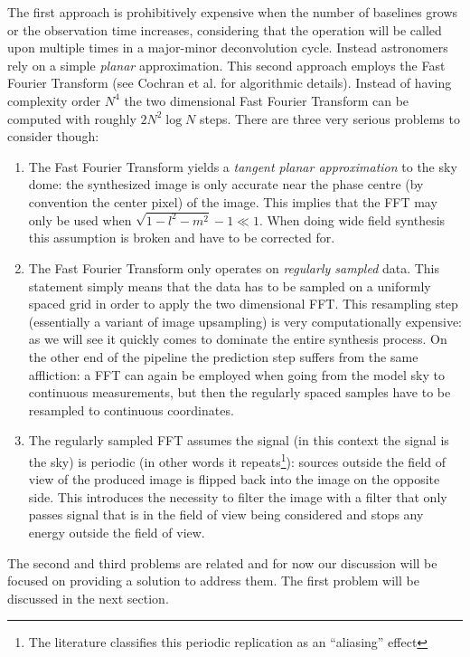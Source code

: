  The first approach is prohibitively expensive when the number of baselines grows or the observation time increases, considering that the operation will be called upon multiple times in a major-minor deconvolution cycle. Instead astronomers rely
 on a simple \emph{planar} approximation. This second approach employs the Fast Fourier Transform (see Cochran et al. \cite{cochran1967fast} for algorithmic details). Instead of having complexity order $N^4$ the two dimensional Fast Fourier 
 Transform can be computed with roughly $2N^2\log{N}$ steps. There are three very serious problems to consider though:
 \begin{enumerate}
  \item The Fast Fourier Transform yields a \emph{tangent planar approximation} to the sky dome: the synthesized image is only accurate near the phase centre (by convention the center pixel) of the image.
        This implies that the FFT may only be used when $\sqrt{1-l^2-m^2} - 1 \ll 1$. When doing wide field synthesis this assumption is broken and have to be corrected for.
  \item The Fast Fourier Transform only operates on \emph{regularly sampled} data. This statement simply means that the data has to be sampled on a uniformly spaced grid in order to 
	apply the two dimensional FFT. This resampling step (essentially a variant of image upsampling) is very computationally expensive: as we will see it quickly comes to 
	dominate the entire synthesis process. On the other end of the pipeline the prediction step suffers from the same affliction: a FFT can again be employed when going 
	from the model sky to continuous measurements, but then the regularly spaced samples have to be resampled to continuous coordinates.
  \item The regularly sampled FFT assumes the signal (in this context the signal is the sky) is periodic (in other words it repeats\footnote{The literature classifies this periodic
	replication as an ``aliasing'' effect}): sources outside the field of view of the produced image is flipped back into the image on the opposite side. This 
	introduces the necessity to filter the image with a filter that only passes signal that is in the field of view being considered and stops any energy 
	outside the field of view.
 \end{enumerate}
 The second and third problems are related and for now our discussion will be focused on providing a solution to address them. The first problem will be discussed in
 the next section.
 
